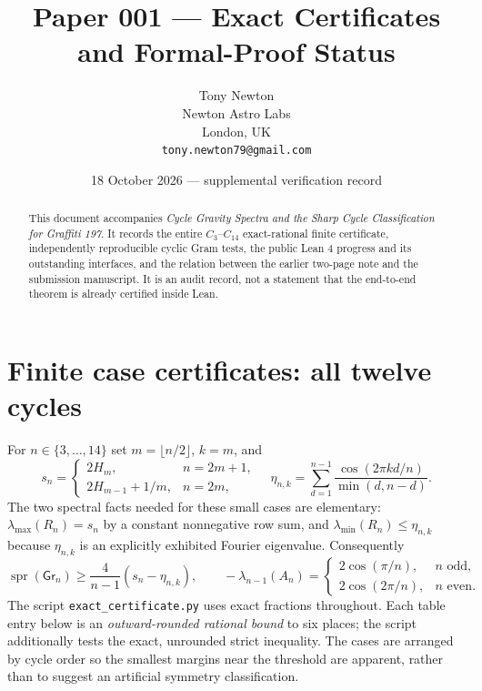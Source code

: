\documentclass[10pt]{article}
\title{Paper 001 --- Exact Certificates and Formal-Proof Status}
\author{Tony Newton\\Newton Astro Labs\\London, UK\\\texttt{tony.newton79@gmail.com}}
\date{18 October 2026 --- supplemental verification record}
\newcommand{\Gr}{\mathsf{Gr}}
\newcommand{\spr}{\operatorname{spr}}
\begin{document}
\maketitle\vspace{-5mm}
\begin{abstract}
This document accompanies \emph{Cycle Gravity Spectra and the Sharp Cycle Classification for Graffiti 197}. It records the entire $C_3$--$C_{14}$ exact-rational finite certificate, independently reproducible cyclic Gram tests, the public Lean 4 progress and its outstanding interfaces, and the relation between the earlier two-page note and the submission manuscript. It is an audit record, not a statement that the end-to-end theorem is already certified inside Lean.
\end{abstract}
\section{Finite case certificates: all twelve cycles}
For $n\in\{3,\ldots,14\}$ set $m=\lfloor n/2\rfloor$, $k=m$, and
\[
s_n=\begin{cases}2H_m,&n=2m+1,\\2H_{m-1}+1/m,&n=2m,\end{cases}\quad
\eta_{n,k}=\sum_{d=1}^{n-1}\frac{\cos(2\pi kd/n)}{\min(d,n-d)}.
\]
The two spectral facts needed for these small cases are elementary: $\lambda_{\max}(R_n)=s_n$ by a constant nonnegative row sum, and $\lambda_{\min}(R_n)\le\eta_{n,k}$ because $\eta_{n,k}$ is an explicitly exhibited Fourier eigenvalue. Consequently
\[
\spr(\Gr_n)\ge\frac4{n-1}(s_n-\eta_{n,k}),\qquad
-\lambda_{n-1}(A_n)=\begin{cases}2\cos(\pi/n),&n\text{ odd},\\2\cos(2\pi/n),&n\text{ even}.\end{cases}
\]
The script \texttt{exact\_certificate.py} uses exact fractions throughout. Each table entry below is an \emph{outward-rounded rational bound} to six places; the script additionally tests the exact, unrounded strict inequality. The cases are arranged by cycle order so the smallest margins near the threshold are apparent, rather than to suggest an artificial symmetry classification.
\end{document}
